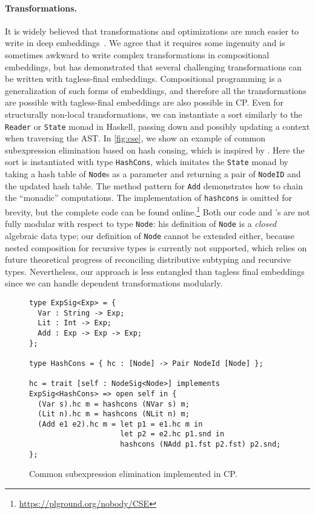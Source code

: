 \paragraph{Transformations.}
It is widely believed that transformations and optimizations are much easier to
write in deep embeddings~\citep{jovanovic2014yinyang,scherr2014implicit}. We
agree that it requires some ingenuity and is sometimes awkward to write complex
transformations in compositional embeddings, but \citet{kiselyov2010typed} has
demonstrated that several challenging transformations can be written with
tagless-final embeddings. Compositional programming is a generalization of such
forms of embeddings, and therefore all the transformations are possible with
tagless-final embeddings are also possible in CP. Even for structurally
non-local transformations, we can instantiate a sort similarly to the
\lstinline{Reader} or \lstinline{State} monad in Haskell, passing down and
possibly updating a context when traversing the AST. In \autoref{fig:cse}, we
show an example of common subexpression elimination based on hash consing, which
is inspired by \citet{kiselyov2011implementing}. Here the sort is instantiated
with type \lstinline{HashCons}, which imitates the \lstinline{State} monad by
taking a hash table of \lstinline{Node}s as a parameter and returning a pair of
\lstinline{NodeID} and the updated hash table. The method pattern for
\lstinline{Add} demonstrates how to chain the ``monadic'' computations. The
implementation of \lstinline{hashcons} is omitted for brevity, but the complete
code can be found online.\footnote{\url{https://plground.org/nobody/CSE}} Both
our code and \citeauthor{kiselyov2011implementing}'s are not fully modular with
respect to type \lstinline{Node}: his definition of \lstinline{Node} is a
\emph{closed} algebraic data type; our definition of \lstinline{Node} cannot be
extended either, because nested composition for recursive types is currently not
supported, which relies on future theoretical progress of reconciling
distributive subtyping and recursive types. Nevertheless, our approach is less
entangled than tagless final embeddings since we can handle dependent
transformations modularly.

\begin{figure}
\begin{lstlisting}
type ExpSig<Exp> = {
  Var : String -> Exp;
  Lit : Int -> Exp;
  Add : Exp -> Exp -> Exp;
};

type HashCons = { hc : [Node] -> Pair NodeId [Node] };

hc = trait [self : NodeSig<Node>] implements ExpSig<HashCons> => open self in {
  (Var s).hc m = hashcons (NVar s) m;
  (Lit n).hc m = hashcons (NLit n) m;
  (Add e1 e2).hc m = let p1 = e1.hc m in
                     let p2 = e2.hc p1.snd in
                     hashcons (NAdd p1.fst p2.fst) p2.snd;
};
\end{lstlisting}
\caption{Common subexpression elimination implemented in CP.} \label{fig:cse}
\end{figure}


